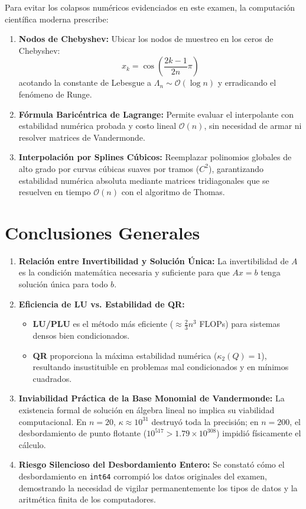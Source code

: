\documentclass[11pt,a4paper]{article}
\theoremstyle{definition}
\theoremstyle{remark}
\begin{document}
Para evitar los colapsos numéricos evidenciados en este examen, la computación científica moderna prescribe:
\begin{enumerate}[leftmargin=*]
    \item \textbf{Nodos de Chebyshev:} Ubicar los nodos de muestreo en los ceros de Chebyshev:
    \begin{equation}
        x_k = \cos\left(\frac{2k-1}{2n}\pi\right)
    \end{equation}
    acotando la constante de Lebesgue a $\Lambda_n \sim \mathcal{O}(\log n)$ y erradicando el fenómeno de Runge.
    \item \textbf{Fórmula Baricéntrica de Lagrange:} Permite evaluar el interpolante con estabilidad numérica probada y costo lineal $\mathcal{O}(n)$, sin necesidad de armar ni resolver matrices de Vandermonde.
    \item \textbf{Interpolación por Splines Cúbicos:} Reemplazar polinomios globales de alto grado por curvas cúbicas suaves por tramos ($C^2$), garantizando estabilidad numérica absoluta mediante matrices tridiagonales que se resuelven en tiempo $\mathcal{O}(n)$ con el algoritmo de Thomas.
\end{enumerate}

\section{Conclusiones Generales}

\begin{enumerate}[leftmargin=*]
    \item \textbf{Relación entre Invertibilidad y Solución Única:} La invertibilidad de $A$ es la condición matemática necesaria y suficiente para que $Ax = b$ tenga solución única para todo $b$.
    \item \textbf{Eficiencia de LU vs. Estabilidad de QR:} 
    \begin{itemize}
        \item \textbf{LU/PLU} es el método más eficiente ($\approx \frac{2}{3}n^3$ FLOPs) para sistemas densos bien condicionados.
        \item \textbf{QR} proporciona la máxima estabilidad numérica ($\kappa_2(Q) = 1$), resultando insustituible en problemas mal condicionados y en mínimos cuadrados.
    \end{itemize}
    \item \textbf{Inviabilidad Práctica de la Base Monomial de Vandermonde:} La existencia formal de solución en álgebra lineal no implica su viabilidad computacional. En $n = 20$, $\kappa \approx 10^{31}$ destruyó toda la precisión; en $n = 200$, el desbordamiento de punto flotante ($10^{517} > 1.79 \times 10^{308}$) impidió físicamente el cálculo.
    \item \textbf{Riesgo Silencioso del Desbordamiento Entero:} Se constató cómo el desbordamiento en \texttt{int64} corrompió los datos originales del examen, demostrando la necesidad de vigilar permanentemente los tipos de datos y la aritmética finita de los computadores.
\end{enumerate}
\end{document}
